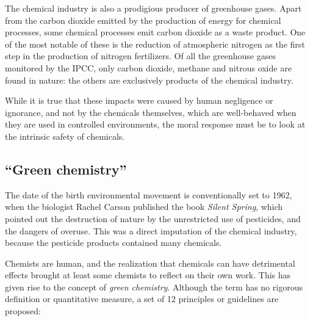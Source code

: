 The chemical industry is also a prodigious producer of greenhouse gases. Apart
from the carbon dioxide emitted by the production of energy for chemical
processes, some chemical processes emit carbon dioxide as a waste product. One
of the most notable of these is the reduction of atmospheric nitrogen as the
first step in the production of nitrogen fertilizers. Of all the greenhouse
gases monitored by the IPCC, only carbon dioxide, methane and nitrous oxide are
found in nature: the others are exclusively products of the chemical industry.

While it is true that these impacts were caused by human negligence or
ignorance, and not by the chemicals themselves, which are well-behaved when they
are used in controlled environments, the moral response must be to look at the
intrinsic safety of chemicals.
 
\subsection{``Green chemistry''}

The date of the birth environmental movement is conventionally set to 1962, when
the biologist Rachel Carson published the book \textit{Silent Spring}, which
pointed out the destruction of nature by the unrestricted use of pesticides, and
the dangers of overuse. This was a direct imputation of the chemical industry,
because the pesticide products contained many chemicals. 

Chemists are human, and the realization that chemicals can have detrimental
effects brought at least some chemists to reflect on their own work. This has
given rise to the concept of \textit{green chemistry}. Although the term has no
rigorous definition or quantitative measure\autocite{Linthorst2010}, a set of 12
principles or guidelines are proposed:


